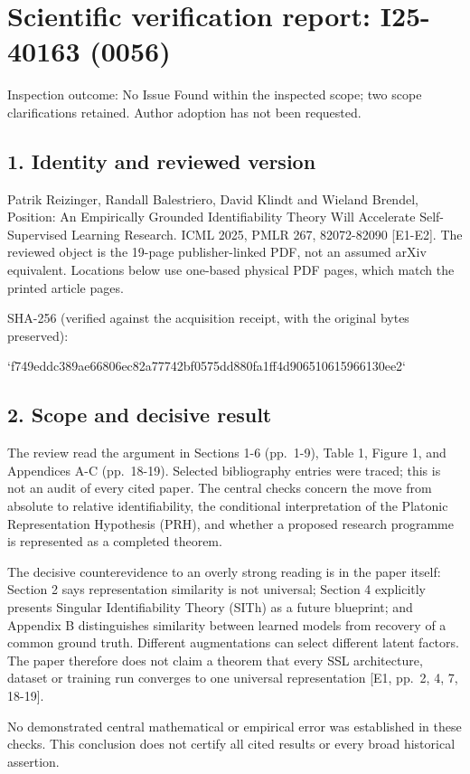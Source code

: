 \documentclass[10pt]{article}
\begin{document}
\section*{Scientific verification report: I25-40163 (0056)}
Inspection outcome: No Issue Found within the inspected scope; two scope clarifications retained. Author adoption has not been requested.\par
\subsection*{1. Identity and reviewed version}
Patrik Reizinger, Randall Balestriero, David Klindt and Wieland Brendel, Position: An Empirically Grounded Identifiability Theory Will Accelerate Self-Supervised Learning Research. ICML 2025, PMLR 267, 82072-82090 [E1-E2]. The reviewed object is the 19-page publisher-linked PDF, not an assumed arXiv equivalent. Locations below use one-based physical PDF pages, which match the printed article pages.\par
SHA-256 (verified against the acquisition receipt, with the original bytes preserved):\par
`f749eddc389ae66806ec82a77742bf0575dd880fa1ff4d906510615966130ee2`\par
\subsection*{2. Scope and decisive result}
The review read the argument in Sections 1-6 (pp. 1-9), Table 1, Figure 1, and Appendices A-C (pp. 18-19). Selected bibliography entries were traced; this is not an audit of every cited paper. The central checks concern the move from absolute to relative identifiability, the conditional interpretation of the Platonic Representation Hypothesis (PRH), and whether a proposed research programme is represented as a completed theorem.\par
The decisive counterevidence to an overly strong reading is in the paper itself: Section 2 says representation similarity is not universal; Section 4 explicitly presents Singular Identifiability Theory (SITh) as a future blueprint; and Appendix B distinguishes similarity between learned models from recovery of a common ground truth. Different augmentations can select different latent factors. The paper therefore does not claim a theorem that every SSL architecture, dataset or training run converges to one universal representation [E1, pp. 2, 4, 7, 18-19].\par
No demonstrated central mathematical or empirical error was established in these checks. This conclusion does not certify all cited results or every broad historical assertion.\par
\end{document}
